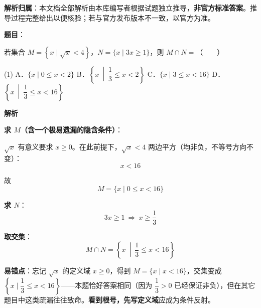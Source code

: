

\begin{gknotice}
\textbf{解析归属}：本文档全部解析由本库编写者根据试题独立推导，\textbf{非官方标准答案}。推导过程完整给出以便核验；若与官方发布版本不一致，以官方为准。
\end{gknotice}

\par\medskip


\begin{answer}

\textbf{题目}：

若集合 $M=\left\{x\mid\sqrt x<4\right\}$，$N=\{x\mid3x\ge1\}$，则 $M\cap N=$\mbox{（　　）}

\begin{gkopts}(1)
\task A．$\{x\mid0\le x<2\}$
\task B．$\left\{x\ \middle|\ \dfrac13\le x<2\right\}$
\task C．$\{x\mid3\le x<16\}$
\task D．$\left\{x\ \middle|\ \dfrac13\le x<16\right\}$
\end{gkopts}

\textbf{解析}

\textbf{求 $M$（含一个极易遗漏的隐含条件）}：

$\sqrt x$ 有意义要求 $x\ge0$。在此前提下，$\sqrt x<4$ 两边平方（均非负，不等号方向不变）：
\nopagebreak[4]
\[x<16\]

故
\nopagebreak[4]
\[M=\{x\mid0\le x<16\}\]

\textbf{求 $N$}：
\nopagebreak[4]
\[3x\ge1\ \Longrightarrow\ x\ge\frac13\]

\textbf{取交集}：
\nopagebreak[4]
\[M\cap N=\left\{x\ \middle|\ \frac13\le x<16\right\}\]

\begin{gktip}
\textbf{易错点}：忘记 $\sqrt x$ 的定义域 $x\ge0$，得到 $M=\{x\mid x<16\}$，交集变成 $\left\{x\mid\dfrac13\le x<16\right\}$——本题恰好答案相同（因为 $\dfrac13>0$ 已经保证非负），但在其它题目中这类疏漏往往致命。\textbf{看到根号，先写定义域}应成为条件反射。
\end{gktip}


\par\medskip

\end{answer}
